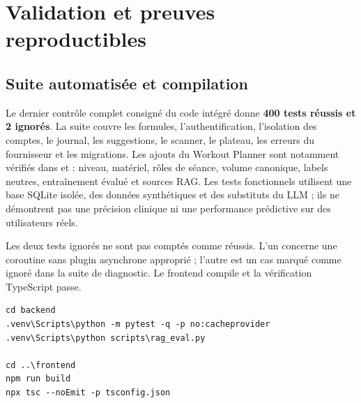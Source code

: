 \documentclass[11pt,a4paper]{article}
\begin{document}
\clearpage


\clearpage
\section{Validation et preuves reproductibles}
\subsection{Suite automatisée et compilation}
Le dernier contrôle complet consigné du code intégré donne \textbf{400 tests réussis et 2 ignorés}. La suite couvre les formules, l'authentification, l'isolation des comptes, le journal, les suggestions, le scanner, le plateau, les erreurs du fournisseur et les migrations. Les ajouts du Workout Planner sont notamment vérifiés dans  et  : niveau, matériel, rôles de séance, volume canonique, labels neutres, entraînement évalué et sources RAG. Les tests fonctionnels utilisent une base SQLite isolée, des données synthétiques et des substituts du LLM ; ils ne démontrent pas une précision clinique ni une performance prédictive sur des utilisateurs réels.

Les deux tests ignorés ne sont pas comptés comme réussis. L'un concerne une coroutine sans plugin asynchrone approprié ; l'autre est un cas marqué comme ignoré dans la suite de diagnostic. Le frontend compile et la vérification TypeScript passe.
\begin{lstlisting}[caption={Commandes de vérification du projet}]
cd backend
.venv\Scripts\python -m pytest -q -p no:cacheprovider
.venv\Scripts\python scripts\rag_eval.py

cd ..\frontend
npm run build
npx tsc --noEmit -p tsconfig.json
\end{lstlisting}
\end{document}
